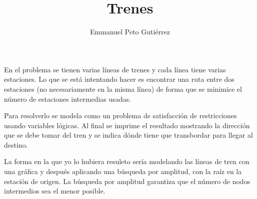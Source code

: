 \documentclass{article}
\title{Trenes}
\author{Emmanuel Peto Gutiérrez}
\begin{document}
\maketitle

En el problema se tienen varias líneas de trenes y cada línea tiene varias estaciones. Lo que se está intentando hacer es encontrar una ruta entre dos estaciones (no necesariamente en la misma línea) de forma que se minimice el número de estaciones intermedias usadas.

Para resolverlo se modela como un problema de satisfacción de restricciones usando variables lógicas. Al final se imprime el resultado mostrando la dirección que se debe tomar del tren y se indica dónde tiene que transbordar para llegar al destino.

La forma en la que yo lo hubiera resuleto sería modelando las líneas de tren con una gráfica y después aplicando una búsqueda por amplitud, con la raíz en la estación de origen. La búsqueda por amplitud garantiza que el número de nodos intermedios sea el menor posible.
\end{document}
